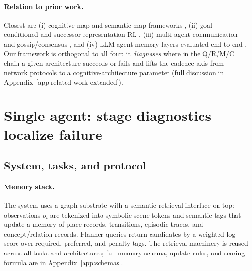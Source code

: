 \documentclass{article}
\begin{document}
\paragraph{Relation to prior work.} Closest are (i) cognitive-map and semantic-map frameworks \citep{tolman1948cognitive,okeefe1978hippocampus,kuipers2000spatial,gupta2017cognitive,savinov2018semi}, (ii) goal-conditioned and successor-representation RL \citep{andrychowicz2017hindsight,ghosh2021learning,dayan1993improving,stachenfeld2017hippocampus,momennejad2017successor}, (iii) multi-agent communication \citep{lowe2017maddpg,foerster2018ctde,sukhbaatar2016commnet,foerster2016learning} and gossip/consensus \citep{boyd2006gossip,xiao2007distributed}, and (iv) LLM-agent memory layers evaluated end-to-end \citep{wang2023voyager,shinn2023reflexion,packer2023memgpt}. Our framework is orthogonal to all four: it \emph{diagnoses} where in the Q/R/M/C chain a given architecture succeeds or fails and lifts the cadence axis from network protocols to a cognitive-architecture parameter (full discussion in Appendix~\ref{app:related-work-extended}).

\section{Single agent: stage diagnostics localize failure}
\label{sec:single}

\subsection{System, tasks, and protocol}
\label{sec:single-setup}

\paragraph{Memory stack.}
The system uses a graph substrate with a semantic retrieval interface on top: observations $o_t$ are tokenized into symbolic scene tokens and semantic tags that update a memory of place records, transitions, episodic traces, and concept/relation records. Planner queries return candidates by a weighted log-score over required, preferred, and penalty tags. The retrieval machinery is reused across all tasks and architectures; full memory schema, update rules, and scoring formula are in Appendix~\ref{app:schemas}.
\end{document}
